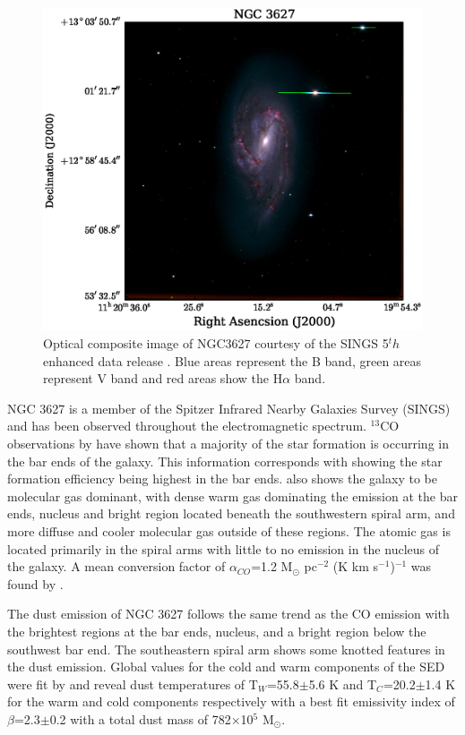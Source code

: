 \begin{figure}
  \centering
  \includegraphics[width=1.\textwidth]{intro_imgs/rgb_tst.eps}
  \caption{Optical composite image of NGC3627 courtesy of the SINGS 5$^th$ enhanced data release \citep{kennicutt2003}.  Blue areas represent the B band, green areas represent V band and red areas show the H$\alpha$ band.}
  \label{fig:ngc3627_opt}
\end{figure}

NGC 3627 is a member of the Spitzer Infrared Nearby Galaxies Survey (SINGS) \citep{kennicutt2003} and has been observed throughout the electromagnetic spectrum.  $^{13}$CO observations by \cite{watanabe2011} have shown that a majority of the star formation is occurring in the bar ends of the galaxy.  This information corresponds with \cite{warren2010} showing the star formation efficiency being highest in the bar ends.  \cite{warren2010} also shows the galaxy to be molecular gas dominant, with dense warm gas dominating the emission at the bar ends, nucleus and bright region located beneath the southwestern spiral arm, and more diffuse and cooler molecular gas outside of these regions.  The atomic gas is located primarily in the spiral arms with little to no emission in the nucleus of the galaxy.  A mean conversion factor of $\alpha_{CO}$=1.2 M$_\odot$ pc$^{-2}$ (K km s$^{-1}$)$^{-1}$ was found by \cite{sandstrom2013}.

The dust emission of NGC 3627 follows the same trend as the CO emission with the brightest regions at the bar ends, nucleus, and a bright region below the southwest bar end.  The southeastern spiral arm shows some knotted features in the dust emission.  Global values for the cold and warm components of the SED were fit by \cite{galametz2012} and reveal dust temperatures of T$_W$=55.8$\pm$5.6 K and T$_C$=20.2$\pm$1.4 K for the warm and cold components respectively with a best fit emissivity index of $\beta$=2.3$\pm$0.2 with a total dust mass of 782$\times$10$^5$ M$_\odot$.
